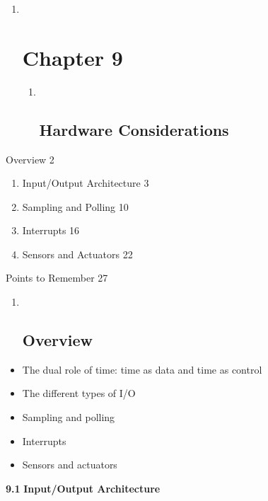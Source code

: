 \begin{enumerate}
\item ~
  \section{Chapter 9}\label{chapter-9}

  \begin{enumerate}
  \item ~
    \subsection{Hardware Considerations}\label{hardware-considerations}
  \end{enumerate}
\end{enumerate}

Overview 2

\begin{enumerate}
\def\labelenumi{\arabic{enumi}.}
\item
  Input/Output Architecture 3
\item
  Sampling and Polling 10
\item
  Interrupts 16
\item
  Sensors and Actuators 22
\end{enumerate}

Points to Remember 27

\begin{enumerate}
\item ~
  \subsection{}\label{section}

  \subsection{Overview}\label{overview}
\end{enumerate}

\begin{itemize}
\item
  The dual role of time: time as data and time as control
\item
  The different types of I/O
\item
  Sampling and polling
\item
  Interrupts
\item
  Sensors and actuators
\end{itemize}

\textbf{9.1} \protect\hypertarget{teil2}{}{}\textbf{Input/Output
Architecture}

